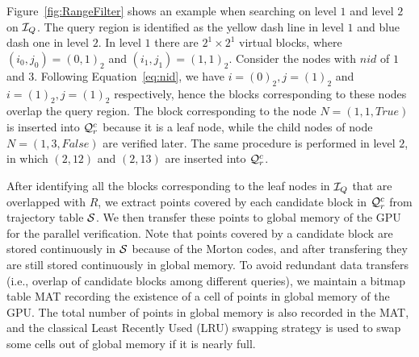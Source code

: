 \documentclass[10pt,conference,letterpaper]{IEEEtran}
\newcommand{\rangeq}{{{\cal Q}_r}\xspace}
\newcommand{\rangecand}{{{\cal Q}_r^c}\xspace}
\newcommand{\trajtable}{{\cal S}\xspace}
\newcommand{\treeindex}{{{\cal I}_Q}\xspace}
\begin{document}
Figure~\ref{fig:RangeFilter} shows an example when searching on level $1$ and level $2$ on $\treeindex$. The query region is identified as the yellow dash line in level $1$ and blue dash one in level $2$. In level $1$ there are $2^1\times 2^1$ virtual blocks, where $(i_0,j_0)=(0, 1)_2$ and $(i_1,j_1)=(1, 1)_2$. Consider the nodes with $nid$ of $1$ and $3$. Following Equation~\ref{eq:nid}, we have $i=(0)_2, j=(1)_2$ and $i=(1)_2, j=(1)_2$ respectively, hence the blocks corresponding to these nodes overlap the query region. The block corresponding to the node $N=(1,1,True)$ is inserted into $\rangecand$ because it is a leaf node, while the child nodes of node $N=(1,3,False)$ are verified later. The same procedure is performed in level $2$, in which $(2,12)$ and $(2,13)$ are inserted into $\rangecand$.

After identifying all the blocks corresponding to the leaf nodes in $\treeindex$ that are overlapped with $R$, we extract points covered by each candidate block in $\rangecand$ from trajectory table $\trajtable$. We then transfer these points to global memory of the GPU for the parallel verification. Note that points covered by a candidate block are stored continuously in $\trajtable$ because of the Morton codes, and after transfering they are still stored continuously in global memory.
To avoid redundant data transfers (i.e., overlap of candidate blocks among different queries), we maintain a bitmap table MAT recording the existence of a cell of points in global memory of the GPU.
The total number of points in global memory is also recorded in the MAT, and the classical Least Recently Used (LRU) swapping strategy is used to swap some cells out of global memory if it is nearly full.
\end{document}
